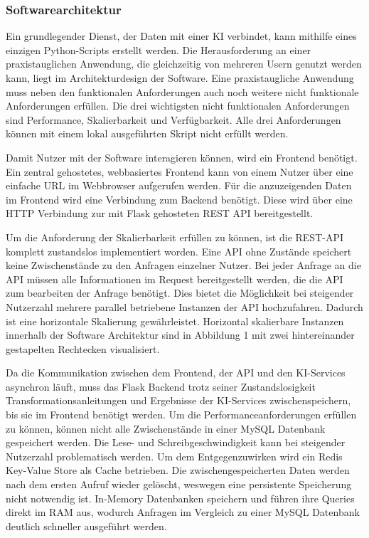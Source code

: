 \subsubsection{Softwarearchitektur}
Ein grundlegender Dienst, der Daten mit einer KI verbindet, kann mithilfe eines einzigen Python-Scripts erstellt werden. Die Herausforderung an einer praxistauglichen Anwendung, die gleichzeitig von mehreren Usern genutzt werden kann, liegt im  Architekturdesign der Software. Eine praxistaugliche Anwendung muss neben den funktionalen Anforderungen auch noch weitere nicht funktionale Anforderungen erfüllen. Die drei wichtigsten nicht funktionalen Anforderungen sind Performance, Skalierbarkeit und Verfügbarkeit. Alle drei Anforderungen können mit einem lokal ausgeführten Skript nicht erfüllt werden. 

Damit Nutzer mit der Software interagieren können, wird ein Frontend benötigt. Ein zentral gehostetes, webbasiertes Frontend kann von einem Nutzer über eine einfache URL im Webbrowser aufgerufen werden. Für die anzuzeigenden Daten im Frontend wird eine Verbindung zum Backend benötigt. Diese wird über eine HTTP Verbindung zur mit Flask gehosteten REST API bereitgestellt.

Um die Anforderung der Skalierbarkeit erfüllen zu können, ist die REST-API komplett zustandslos implementiert worden. Eine API ohne Zustände speichert keine Zwischenstände zu den Anfragen einzelner Nutzer. Bei jeder Anfrage an die API müssen alle Informationen im Request bereitgestellt werden, die die API zum bearbeiten der Anfrage benötigt. Dies bietet die Möglichkeit bei steigender Nutzerzahl mehrere parallel betriebene Instanzen der API hochzufahren. Dadurch ist eine horizontale Skalierung gewährleistet. Horizontal skalierbare Instanzen innerhalb der Software Architektur sind in Abbildung 1 mit zwei hintereinander gestapelten Rechtecken visualisiert.

Da die Kommunikation zwischen dem Frontend, der API und den KI-Services asynchron läuft, muss das Flask Backend trotz seiner Zustandslosigkeit Transformationsanleitungen und Ergebnisse der KI-Services zwischenspeichern, bis sie im Frontend benötigt werden. Um die Performanceanforderungen erfüllen zu können, können nicht alle Zwischenstände in einer MySQL Datenbank gespeichert werden. Die Lese- und Schreibgeschwindigkeit kann bei steigender Nutzerzahl problematisch werden. Um dem Entgegenzuwirken wird ein Redis Key-Value Store als Cache betrieben. Die zwischengespeicherten Daten werden nach dem ersten Aufruf wieder gelöscht, weswegen eine persistente Speicherung nicht notwendig ist. In-Memory Datenbanken speichern und führen ihre Queries direkt im RAM aus, wodurch Anfragen im Vergleich zu einer MySQL Datenbank deutlich schneller ausgeführt werden.

